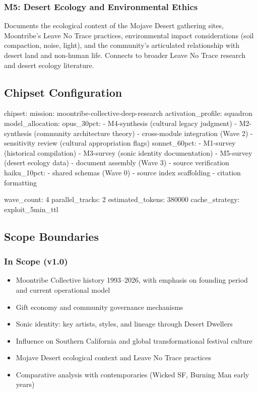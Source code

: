 \documentclass[11pt,letterpaper]{article}
\begin{document}
\subsubsection{M5: Desert Ecology and Environmental Ethics}

Documents the ecological context of the Mojave Desert gathering sites, Moontribe's Leave No Trace practices, environmental impact considerations (soil compaction, noise, light), and the community's articulated relationship with desert land and non-human life. Connects to broader Leave No Trace research and desert ecology literature.

\subsection{Chipset Configuration}

\begin{asciibox}
chipset:
  mission: moontribe-collective-deep-research
  activation_profile: squadron
  model_allocation:
    opus_30pct:
      - M4-synthesis (cultural legacy judgment)
      - M2-synthesis (community architecture theory)
      - cross-module integration (Wave 2)
      - sensitivity review (cultural appropriation flags)
    sonnet_60pct:
      - M1-survey (historical compilation)
      - M3-survey (sonic identity documentation)
      - M5-survey (desert ecology data)
      - document assembly (Wave 3)
      - source verification
    haiku_10pct:
      - shared schemas (Wave 0)
      - source index scaffolding
      - citation formatting

  wave_count: 4
  parallel_tracks: 2
  estimated_tokens: 380000
  cache_strategy: exploit_5min_ttl
\end{asciibox}

\subsection{Scope Boundaries}

\subsubsection{In Scope (v1.0)}

\begin{itemize}[nosep]
  \item Moontribe Collective history 1993--2026, with emphasis on founding period and current operational model
  \item Gift economy and community governance mechanisms
  \item Sonic identity: key artists, styles, and lineage through Desert Dwellers
  \item Influence on Southern California and global transformational festival culture
  \item Mojave Desert ecological context and Leave No Trace practices
  \item Comparative analysis with contemporaries (Wicked SF, Burning Man early years)
\end{itemize}
\end{document}
